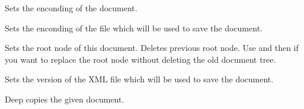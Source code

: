 
Sets the enconding of the document.


\label{wxxmldocumentsetfileencoding}


Sets the enconding of the file which will be used to save the document.


\label{wxxmldocumentsetroot}


Sets the root node of this document. Deletes previous root node.
Use  and then 
 if you want
to replace the root node without deleting the old document tree.


\label{wxxmldocumentsetversion}


Sets the version of the XML file which will be used to save the document.


\label{wxxmldocumentoperatorassign}


Deep copies the given document.

